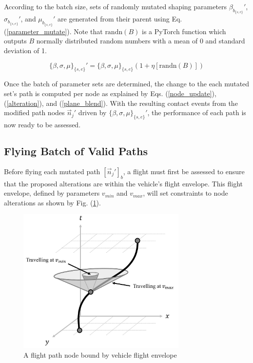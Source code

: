 \documentclass[conf]{new-aiaa}
\begin{document}
According to the batch size, sets of randomly mutated shaping parameters $\beta_{b_{\{s, e\}}}'$, $\sigma_{b_{\{s, e\}}}'$, and $\mu_{b_{\{s, e\}}}'$ are generated from their parent using Eq. (\ref{parameter_mutate}). Note that $\mbox{randn}(B)$ is a PyTorch function which outputs $B$ normally distributed random numbers with a mean of 0 and standard deviation of 1.

\begin{equation}
\label{parameter_mutate}
{\{\beta, \sigma, \mu\}}_{\{s, e\}}' = {\{\beta, \sigma, \mu\}}_{\{s, e\}}\left(1 + \eta\left[\mbox{randn}(B)\right]\right)
\end{equation}

Once the batch of parameter sets are determined, the change to the each mutated set's path is computed per node as explained by Eqs. (\ref{node_update}), (\ref{alteration}), and (\ref{plane_blend}). With the resulting contact events from the modified path nodes $\vec{n}_j'$ driven by ${\{\beta, \sigma, \mu\}}_{\{s, e\}}'$, the performance of each path is now ready to be assessed.


\subsection{Flying Batch of Valid Paths}
\label{Flying-Batch-of-Valid-Paths}

Before flying each mutated path $\left[\vec{n}_j'\right]_b$, a flight must first be assessed to ensure that the proposed alterations are within the vehicle's flight envelope. This flight envelope, defined by parameters $v_{min}$ and $v_{max}$, will set constraints to node alterations as shown by Fig. (\ref{velocity-saturation}).

\begin{figure}[hbt!]
\centering
\includegraphics[width=0.75\textwidth]{figs/velocity-saturation-concept}
\caption{A flight path node bound by vehicle flight envelope}
\label{velocity-saturation}
\end{figure}
\end{document}
